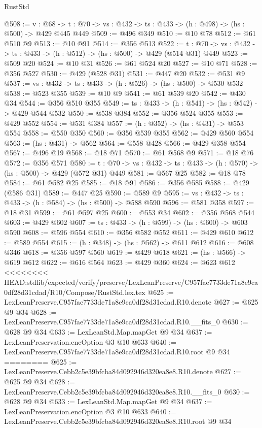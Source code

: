 \begin{lexlean}{RustStd}
\begin{coremodule}
{\begin{coremodule}
@508 := {v : @68} ->
  {t : @70} -> {vs : @432} -> {ts : @433} -> (h : @498) -> (hs : @500) -> @429 @445 @449
@509 := @496 @349
@510 := @10 @78
@512 := @61 @510 @9
@513 := @10 @91
@514 := @356 @513
@522 := {t : @70} -> {vs : @432} -> {ts : @433} -> (h : @512) -> (hs : @500) -> @429 (@514 @31) @449
@523 := @509 @20
@524 := @10 @31
@526 := @61 @524 @20
@527 := @10 @71
@528 := @356 @527
@530 := @429 (@528 @31)
@531 := @447 @20
@532 := @531 @9
@537 := {vs : @432} -> {ts : @433} -> (h : @526) -> (hs : @500) -> @530 @532
@538 := @523 @355
@539 := @10 @9
@541 := @61 @539 @20
@542 := @430 @34
@544 := @356 @510 @355
@549 := {ts : @433} -> (h : @541) -> (hs : @542) -> @429 @544 @532
@550 := @538 @384
@552 := @356 @524 @355
@553 := @429 @552
@554 := @531 @384
@557 := (h : @352) -> (hs : @431) -> @553 @554
@558 := @550 @350
@560 := @356 @539 @355
@562 := @429 @560 @554
@563 := (hs : @431) -> @562
@564 := @558 @428
@566 := @429 @358 @554
@567 := @496 @19
@568 := @18 @71
@570 := @61 @568 @9
@571 := @18 @76
@572 := @356 @571
@580 := {t : @70} -> {vs : @432} -> {ts : @433} -> (h : @570) -> (hs : @500) -> @429 (@572 @31) @449
@581 := @567 @25
@582 := @18 @78
@584 := @61 @582 @25
@585 := @18 @91
@586 := @356 @585
@588 := @429 (@586 @31)
@589 := @447 @25
@590 := @589 @9
@595 := {vs : @432} -> {ts : @433} -> (h : @584) -> (hs : @500) -> @588 @590
@596 := @581 @358
@597 := @18 @31
@599 := @61 @597 @25
@600 := @553 @34
@602 := @356 @568 @544
@603 := @429 @602
@607 := {ts : @433} -> (h : @599) -> (hs : @600) -> @603 @590
@608 := @596 @554
@610 := @356 @582 @552
@611 := @429 @610
@612 := @589 @554
@615 := (h : @348) -> (hs : @562) -> @611 @612
@616 := @608 @346
@618 := @356 @597 @560
@619 := @429 @618
@621 := (hs : @566) -> @619 @612
@622 := @616 @564
@623 := @429 @360
@624 := @623 @612
<<<<<<<< HEAD:stdlib/expected/verify/preserve/LexLeanPreserve/C957fae7733de71a8e9ca0df28d31cdad/R10/Compose/RustStd.lex.tex
@625 := LexLeanPreserve.C957fae7733de71a8e9ca0df28d31cdad.R10.denote
@627 := @625 @9 @34
@628 := LexLeanPreserve.C957fae7733de71a8e9ca0df28d31cdad.R10.__fits_0
@630 := @628 @9 @34
@633 := LexLeanStd.Map.mapGet @9 @34
@637 := LexLeanPreservation.encOption @3 @10 @633
@640 := LexLeanPreserve.C957fae7733de71a8e9ca0df28d31cdad.R10.root @9 @34
========
@625 := LexLeanPreserve.Cebb2c5e39bfcba84d092946d320ea8e8.R10.denote
@627 := @625 @9 @34
@628 := LexLeanPreserve.Cebb2c5e39bfcba84d092946d320ea8e8.R10.__fits_0
@630 := @628 @9 @34
@633 := LexLeanStd.Map.mapGet @9 @34
@637 := LexLeanPreservation.encOption @3 @10 @633
@640 := LexLeanPreserve.Cebb2c5e39bfcba84d092946d320ea8e8.R10.root @9 @34

\end{coremodule}}
\end{coremodule}
\end{lexlean}
